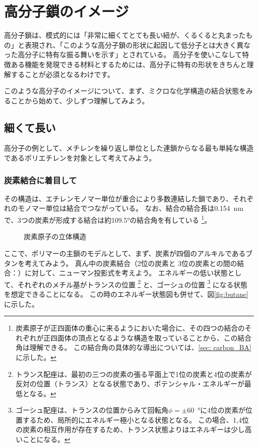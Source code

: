 \documentclass[a4paper,11pt]{jlreq}
\begin{document}
\section{高分子鎖のイメージ}
高分子鎖は、模式的には「非常に細くてとても長い紐が、くるくると丸まったもの」と表現され、「このような高分子鎖の形状に起因して低分子とは大きく異なった高分子に特有な振る舞いを示す」とされている。
高分子を使いこなして特徴ある機能を発現できる材料とするためには、高分子に特有の形状をきちんと理解することが必須となるわけです。

このような高分子のイメージについて、まず、ミクロな化学構造の結合状態をみることから始めて、少しずつ理解してみよう。

\subsection{細くて長い}

高分子の例として、メチレンを繰り返し単位とした連鎖からなる最も単純な構造であるポリエチレンを対象として考えてみよう。

\subsubsection{炭素結合に着目して}
その構造は、エチレンモノマー単位が重合により多数連結した鎖であり、それぞれのモノマー単位は結合でつながっている。
なお、結合の結合長は\qty{0.154}{nm}で、3つの炭素が形成する結合は約\ang{109.5}の結合角を有している
\footnote
{
炭素原子が正四面体の重心に来るようにおいた場合に、その四つの結合のそれぞれが正四面体の頂点となるような構造を取っていることから、この結合角は理解できる。
この結合角の具体的な導出については、\ref{sec: carbon_BA} に示した。
}。

\begin{figure}[htb]
	\centering
		
		\caption{炭素原子の立体構造}
		\label{fig:carbon}
\end{figure}

ここで、ポリマーの主鎖のモデルとして、まず、炭素が四個のアルキルであるブタンを考えてみよう。
真ん中の炭素結合（2位の炭素と 3位の炭素との間の結合：）に対して、ニューマン投影式を考えよう。
エネルギーの低い状態として、それぞれのメチル基がトランスの位置
\footnote
{
トランス配座は、最初の三つの炭素の張る平面上で1位の炭素と4位の炭素が反対の位置（トランス）となる状態であり、ポテンシャル・エネルギーが最低となる。
}
と、ゴーシュの位置
\footnote
{
ゴーシュ配座は、トランスの位置からみて回転角$\phi = \pm$\qty{60}{\degree}に4位の炭素が位置するため、局所的にエネルギー極小となる状態となる。
この場合、1,4位の炭素の相互作用が存在するため、トランス状態よりはエネルギーは少し高いことになる。
}
になる状態を想定できることになる。
この時のエネルギー状態図も併せて、図\ref{fig:butane}に示した。
\end{document}
